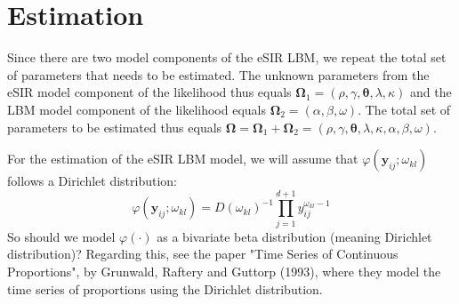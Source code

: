 \documentclass[10pt,a4paper]{article}
\begin{document}
\begin{figure}[H]
	\centering
\end{figure}	


\section{Estimation}

Since there are two model components of the eSIR LBM, we repeat the total set of parameters that needs to be estimated. The unknown parameters from the eSIR model component of the likelihood thus equals 
%
$ 
\boldsymbol{\Omega}_1 = (\rho, \gamma, \boldsymbol{\theta}, \lambda, \kappa)
$ 
%
and the LBM model component of the likelihood equals
%
$ 
\boldsymbol{\Omega}_2 = (\alpha, \beta, \omega).
$ 
%
The total set of parameters to be estimated thus equals 
%
$
\boldsymbol{\Omega} = \boldsymbol{\Omega}_1 + \boldsymbol{\Omega}_2 = (\rho, \gamma, \boldsymbol{\theta}, \lambda, \kappa, \alpha, \beta, \omega).
$
%

For the estimation of the eSIR LBM model, we will assume that $\varphi(\mathbf{y}_{ij}; \omega_{kl})$ follows a Dirichlet distribution:
%
$$
\varphi(\mathbf{y}_{ij}; \omega_{kl}) = D(\omega_{kl})^{-1} \prod_{j=1}^{d+1} y_{ij}^{\omega_{kl}-1}
$$
%
So should we model $\varphi(\cdot)$ as a bivariate beta distribution (meaning Dirichlet distribution)? Regarding this, see the paper "Time Series of Continuous Proportions", by Grunwald, Raftery and Guttorp (1993), where they model the time series of proportions using the Dirichlet distribution.
\end{document}

